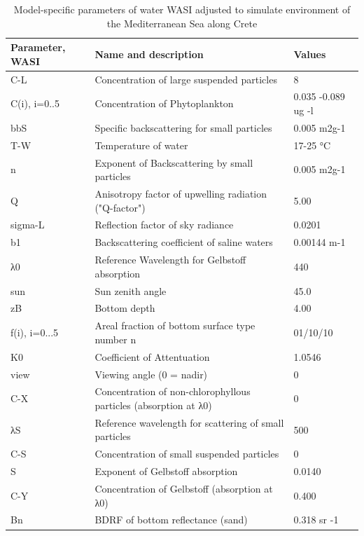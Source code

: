 \documentclass[10pt, a4paper]{article}
\begin{document}
\begin{table}
\caption{Model-specific parameters of water WASI adjusted to simulate environment of the Mediterranean Sea along Crete}
\centering
  \begin{tabular}{|  p{2cm} | p{6cm} | p{25mm} | }
    \hline
    \textbf{Parameter, WASI} & \textbf{Name and description} & \textbf{Values} \\ \hline\hline
    C-L & Concentration of large suspended particles & 8 \\ \hline
   C(i), i=0..5 & Concentration of Phytoplankton & 0.035 -0.089 ug -l \\ \hline
    bbS & Specific backscattering for small particles & 0.005 m2g-1 \\ \hline
   T-W & Temperature of water & 17-25 °C \\ \hline
    n & Exponent of Backscattering by small particles & 0.005 m2g-1 \\ \hline
    Q &Anisotropy factor of upwelling radiation ("Q-factor") & 5.00 \\ \hline
    sigma-L & Reflection factor of sky radiance & 0.0201 \\ \hline
    b1 & Backscattering coefficient of saline waters & 0.00144 m-1 \\ \hline
    λ0 & Reference Wavelength for Gelbstoff absorption & 440 \\ \hline
    sun & Sun zenith angle & 45.0 \\ \hline
    zB & Bottom depth & 4.00 \\ \hline
   f(i), i=0...5 & Areal fraction of bottom surface type number n & 01/10/10 \\ \hline
    K0 & Coefficient of Attentuation & 1.0546 \\ \hline
   view & Viewing angle (0 = nadir) & 0\\ \hline
    C-X & Concentration of non-chlorophyllous particles (absorption at λ0) & 0 \\ \hline
   λS & Reference wavelength for scattering of small particles & 500 \\ \hline
    C-S & Concentration of small suspended particles & 0 \\ \hline
   S & Exponent of Gelbstoff absorption & 0.0140 \\ \hline
    C-Y & Concentration of Gelbstoff (absorption at λ0) & 0.400 \\ \hline
    Bn & BDRF of bottom reflectance (sand) & 0.318 sr -1\\
    \hline
  \end{tabular}
   \label{tab:3}
\end{table}
\end{document}
